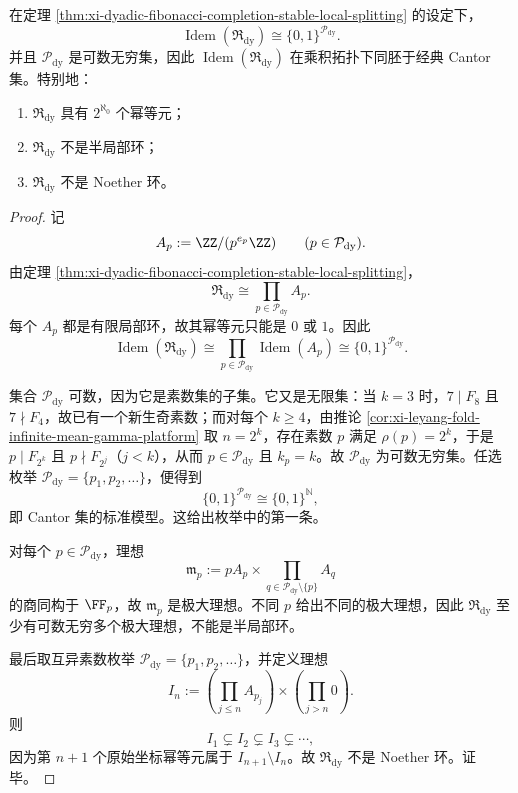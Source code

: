 \begin{corollary}\label{cor:xi-dyadic-fibonacci-completion-cantor-idempotent-skeleton}
在定理 \ref{thm:xi-dyadic-fibonacci-completion-stable-local-splitting} 的设定下，
\[
\operatorname{Idem}(\mathfrak R_{\mathrm{dy}})
\cong
\{0,1\}^{\mathcal P_{\mathrm{dy}}}.
\]
并且 \(\mathcal P_{\mathrm{dy}}\) 是可数无穷集，因此 \(\operatorname{Idem}(\mathfrak R_{\mathrm{dy}})\) 在乘积拓扑下同胚于经典 Cantor 集。特别地：
\begin{enumerate}
  \item \(\mathfrak R_{\mathrm{dy}}\) 具有 \(2^{\aleph_0}\) 个幂等元；
  \item \(\mathfrak R_{\mathrm{dy}}\) 不是半局部环；
  \item \(\mathfrak R_{\mathrm{dy}}\) 不是 Noether 环。
\end{enumerate}
\end{corollary}
\begin{proof}
记
\[
A_p:=\ZZ/(p^{e_p}\ZZ)
\qquad(p\in\mathcal P_{\mathrm{dy}}).
\]
由定理 \ref{thm:xi-dyadic-fibonacci-completion-stable-local-splitting}，
\[
\mathfrak R_{\mathrm{dy}}\cong \prod_{p\in\mathcal P_{\mathrm{dy}}}A_p.
\]
每个 \(A_p\) 都是有限局部环，故其幂等元只能是 \(0\) 或 \(1\)。因此
\[
\operatorname{Idem}(\mathfrak R_{\mathrm{dy}})
\cong
\prod_{p\in\mathcal P_{\mathrm{dy}}}\operatorname{Idem}(A_p)
\cong
\{0,1\}^{\mathcal P_{\mathrm{dy}}}.
\]

集合 \(\mathcal P_{\mathrm{dy}}\) 可数，因为它是素数集的子集。它又是无限集：当 \(k=3\) 时，\(7\mid F_8\) 且 \(7\nmid F_4\)，故已有一个新生奇素数；而对每个 \(k\ge 4\)，由推论 \ref{cor:xi-leyang-fold-infinite-mean-gamma-platform} 取 \(n=2^k\)，存在素数 \(p\) 满足 \(\rho(p)=2^k\)，于是 \(p\mid F_{2^k}\) 且 \(p\nmid F_{2^j}\)（\(j<k\)），从而 \(p\in\mathcal P_{\mathrm{dy}}\) 且 \(k_p=k\)。故 \(\mathcal P_{\mathrm{dy}}\) 为可数无穷集。任选枚举 \(\mathcal P_{\mathrm{dy}}=\{p_1,p_2,\dots\}\)，便得到
\[
\{0,1\}^{\mathcal P_{\mathrm{dy}}}\cong \{0,1\}^{\mathbb N},
\]
即 Cantor 集的标准模型。这给出枚举中的第一条。

对每个 \(p\in\mathcal P_{\mathrm{dy}}\)，理想
\[
\mathfrak m_p
:=
pA_p\times \prod_{q\in\mathcal P_{\mathrm{dy}}\setminus\{p\}}A_q
\]
的商同构于 \(\FF_p\)，故 \(\mathfrak m_p\) 是极大理想。不同 \(p\) 给出不同的极大理想，因此 \(\mathfrak R_{\mathrm{dy}}\) 至少有可数无穷多个极大理想，不能是半局部环。

最后取互异素数枚举 \(\mathcal P_{\mathrm{dy}}=\{p_1,p_2,\dots\}\)，并定义理想
\[
I_n
:=
\left(\prod_{j\le n}A_{p_j}\right)\times
\left(\prod_{j>n}0\right).
\]
则
\[
I_1\subsetneq I_2\subsetneq I_3\subsetneq \cdots,
\]
因为第 \(n+1\) 个原始坐标幂等元属于 \(I_{n+1}\setminus I_n\)。故 \(\mathfrak R_{\mathrm{dy}}\) 不是 Noether 环。证毕。
\end{proof}

